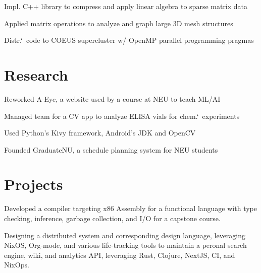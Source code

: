 \documentclass[letterpaper]{cv} %
\begin{document}
\begin{minipage}[t]{0.66\textwidth}

  \begin{tightitemize}
    \item Impl. C++ library to compress and apply linear algebra to sparse matrix data
    \item Applied matrix operations to analyze and graph large 3D mesh structures
    \item Distr.`\ code to COEUS supercluster w/ OpenMP parallel programming pragmas
  \end{tightitemize}

  \section{Research}


  \begin{tightitemize}
    \item Reworked A-Eye, a website used by a course at NEU to teach ML/AI
    \item Managed team for a CV app to analyze ELISA vials for chem.`\ experiments
    \item Used Python's Kivy framework, Android's JDK and OpenCV
    \item Founded GraduateNU, a schedule planning system for NEU students
  \end{tightitemize}

  \section{Projects}

  Developed a compiler targeting x86 Assembly for a functional language with type checking, inference, garbage collection, and  I/O for a capstone course.
  \sectionspace

  Designing a distributed system and corresponding design language, leveraging NixOS, Org-mode, and various life-tracking tools to maintain a peronal search engine, wiki, and analytics API, leveraging Rust, Clojure, NextJS, CI, and NixOps.
  \sectionspace


\end{minipage}
\end{document}
